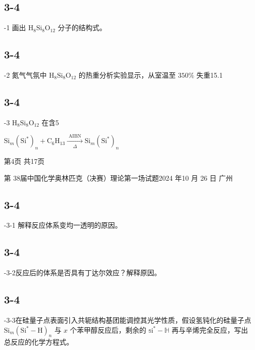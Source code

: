 \subsection*{3-4}
-1 画出 $\mathrm { H } _ { 8 } \mathrm { S i } _ { 8 } \mathrm { O } _ { 1 2 }$ 分子的结构式。

\subsection*{3-4}
-2 氮气气氛中 $\mathrm { H } _ { 8 } \mathrm { S i } _ { 8 } \mathrm { O } _ { 1 2 }$ 的热重分析实验显示，从室温至 $3 5 0 \%$ 失重15.1%

\subsection*{3-4}
-3 $\mathrm { H } _ { 8 } \mathrm { S i } _ { 8 } \mathrm { O } _ { 1 2 }$ 在含5%

$
\mathrm{Si} _ {m} (\mathrm{Si} ^ {*}) _ {n} + \mathrm{C} _ {6} \mathrm{H} _ {1 3} \xrightarrow [ \Delta ]{\text { AIBN }} \mathrm{Si} _ {m} (\mathrm{Si} ^ {*}) _ {n}
$

第4页 共17页

第 38届中国化学奥林匹克（决赛）理论第一场试题2024 年10 月 26 日 广州

\subsection*{3-4}
-3-1 解释反应体系变均一透明的原因。

\subsection*{3-4}
-3-2反应后的体系是否具有丁达尔效应？解释原因。

\subsection*{3-4}
-3-3在硅量子点表面引入共轭结构基团能调控其光学性质，假设氢钝化的硅量子点 $\mathrm { S i } _ { m } ( \mathrm { S i ^ { * } - H } ) _ { n }$ 与 $x$ 个苯甲醇反应后，剩余的 $\mathbb { s } \mathrm { i } ^ { * } { - } \mathbb { H }$ 再与辛烯完全反应，写出总反应的化学方程式。

